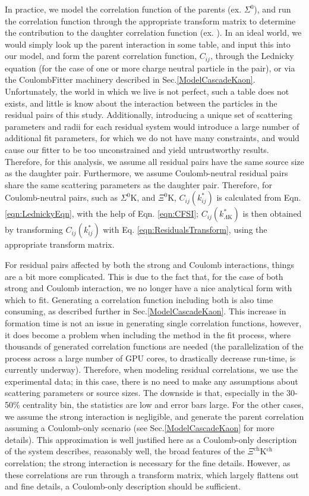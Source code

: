 \documentclass[/home/jesse/Analysis/FemtoAnalysis/AnalysisNotes/AnalysisNoteJBuxton.tex]{subfiles}
\begin{document}
In practice, we model the correlation function of the parents (ex. $\Sigma^{0}$\KchP), and run the correlation function through the appropriate transform matrix to determine the contribution to the daughter correlation function (ex. \LamKchP).  
In an ideal world, we would simply look up the parent interaction in some table, and input this into our model, and form the parent correlation function, $C_{ij}$, through the Lednicky equation (for the case of one or more charge neutral particle in the pair), or via the CoulombFitter machinery described in Sec.\ref{ModelCascadeKaon}.  
Unfortunately, the world in which we live is not perfect, such a table does not exists, and little is know about the interaction between the particles in the residual pairs of this study. 
Additionally, introducing a unique set of scattering parameters and radii for each residual system would introduce a large number of additional fit parameters, for which we do not have many constraints, and would cause our fitter to be too unconstrained and yield untrustworthy results. 
Therefore, for this analysis, we assume all residual pairs have the same source size as the daughter pair.
Furthermore, we assume Coulomb-neutral residual pairs share the same scattering parameters as the daughter pair.
Therefore, for Coulomb-neutral pairs, such as $\Sigma^{0}$K, and $\Xi^{0}$K, $C_{ij}(k^{*}_{ij})$ is calculated from Eqn. \ref{eqn:LednickyEqn}, with the help of Eqn. \ref{eqn:CFSI}; $C_{ij}(k^{*}_{\Lambda\mathrm{K}})$ is then obtained by transforming $C_{ij}(k^{*}_{ij})$ with Eq. \ref{eqn:ResidualsTransform}, using the appropriate transform matrix.  

For residual pairs affected by both the strong and Coulomb interactions, things are a bit more complicated.
This is due to the fact that, for the case of both strong and Coulomb interaction, we no longer have a nice analytical form with which to fit.
Generating a correlation function including both is also time consuming, as described further in Sec.\ref{ModelCascadeKaon}.
This increase in formation time is not an issue in generating single correlation functions, however, it does become a problem when including the method in the fit process, where thousands of generated correlation functions are needed (the parallelization of the process across a large number of GPU cores, to drastically decrease run-time, is currently underway).
Therefore, when modeling \XiKpm residual correlations, we use the experimental \XiKpm data; in this case, there is no need to make any assumptions about scattering parameters or source sizes. 
The downside is that, especially in the 30-50\% centrality bin, the statistics are low and error bars large.  
For the other cases, we assume the strong interaction is negligible, and generate the parent correlation assuming a Coulomb-only scenario (see Sec.\ref{ModelCascadeKaon} for more details).
This approximation is well justified here as a Coulomb-only description of the system describes, reasonably well, the broad features of the $\Xi^{\mathrm{ch}}$K$^{\mathrm{ch}}$ correlation; the strong interaction is necessary for the fine details.  
However, as these correlations are run through a transform matrix, which largely flattens out and fine details, a Coulomb-only description should be sufficient.  
\end{document}
